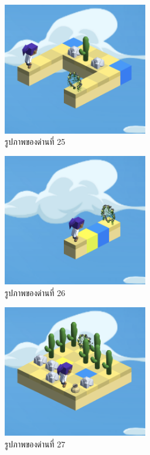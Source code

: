 \begin{figure}[H]
    \begin{center}
    \includegraphics[width=2.5in]{pic-toro/stage/s25.png}
    \end{center}
    \caption[รูปภาพของด่านที่ 25]{รูปภาพของด่านที่ 25}
    \label{s25}
\end{figure}
\begin{figure}[H]
    \begin{center}
    \includegraphics[width=2.5in]{pic-toro/stage/s26.png}
    \end{center}
    \caption[รูปภาพของด่านที่ 26]{รูปภาพของด่านที่ 26}
    \label{s26}
\end{figure}
\begin{figure}[H]
    \begin{center}
    \includegraphics[width=2.5in]{pic-toro/stage/s27.png}
    \end{center}
    \caption[รูปภาพของด่านที่ 27]{รูปภาพของด่านที่ 27}
    \label{s27}
\end{figure}
